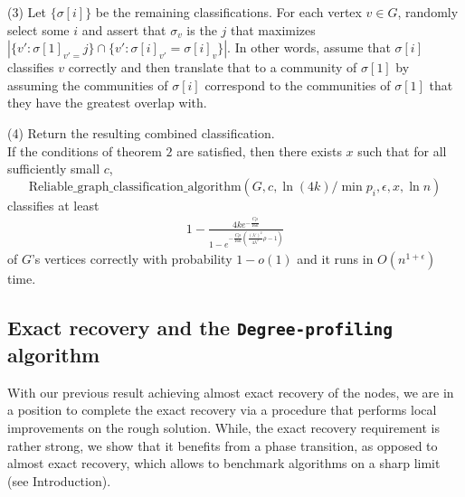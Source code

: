 \documentclass[11pt]{article}
\newcommand{\1}{\mathbb{1}}
\begin{document}
(3) Let $\{\sigma[i]\}$ be the remaining classifications. For each vertex $v\in G$, randomly select some $i$ and assert that $\sigma_v$ is the $j$ that maximizes $|\{v': \sigma[1]_{v'=}j\}\cap\{v':\sigma[i]_{v'}=\sigma[i]_v\}|$. In other words, assume that $\sigma[i]$ classifies $v$ correctly and then translate that to a community of $\sigma[1]$ by assuming the communities of $\sigma[i]$ correspond to the communities of $\sigma[1]$ that they have the greatest overlap with.

(4) Return the resulting combined classification.\\

If the conditions of theorem $2$ are satisfied, then there exists $x$ such that for all sufficiently small $c$, $$\text{Reliable\_graph\_classification\_algorithm}(G,c,\ln(4k)/\min p_i,\epsilon,x,\ln n)$$ classifies at least 
\begin{align}
1- \frac{4ke^{-\frac{C \rho}{16k}}}{1-e^{-\frac{C\rho}{16k}\left(\frac{(\lambda')^2}{4\lambda^2}\rho-1\right)}}
\end{align}
of $G$'s vertices correctly with probability $1-o(1)$ and it runs in $O(n^{1+\epsilon})$ time.

\subsection{Exact recovery and the {\tt Degree-profiling} algorithm}\label{pt2}
With our previous result achieving almost exact recovery of the nodes, we are in a position to complete the exact recovery via a procedure that performs local improvements on the rough solution. While, the exact recovery requirement is rather strong, we show that it benefits from a phase transition, as opposed to almost exact recovery, which allows to benchmark algorithms on a sharp limit (see Introduction). 
\end{document}
